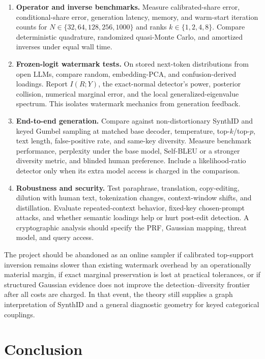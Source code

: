 \documentclass[11pt]{article}
\theoremstyle{definition}
\theoremstyle{remark}
\begin{document}
\begin{enumerate}
\item \textbf{Operator and inverse benchmarks.} Measure calibrated-share error, conditional-share error, generation latency, memory, and warm-start iteration counts for $N\in\{32,64,128,256,1000\}$ and ranks $k\in\{1,2,4,8\}$. Compare deterministic quadrature, randomized quasi-Monte Carlo, and amortized inverses under equal wall time.

\item \textbf{Frozen-logit watermark tests.} On stored next-token distributions from open LLMs, compare random, embedding-PCA, and confusion-derived loadings. Report $I(R;Y)$, the exact-normal detector's power, posterior collision, numerical marginal error, and the local generalized-eigenvalue spectrum. This isolates watermark mechanics from generation feedback.

\item \textbf{End-to-end generation.} Compare against non-distortionary SynthID and keyed Gumbel sampling at matched base decoder, temperature, top-$k$/top-$p$, text length, false-positive rate, and same-key diversity. Measure benchmark performance, perplexity under the base model, Self-BLEU or a stronger diversity metric, and blinded human preference. Include a likelihood-ratio detector only when its extra model access is charged in the comparison.

\item \textbf{Robustness and security.} Test paraphrase, translation, copy-editing, dilution with human text, tokenization changes, context-window shifts, and distillation. Evaluate repeated-context behavior, fixed-key chosen-prompt attacks, and whether semantic loadings help or hurt post-edit detection. A cryptographic analysis should specify the PRF, Gaussian mapping, threat model, and query access.
\end{enumerate}

The project should be abandoned as an online sampler if calibrated top-support inversion remains slower than existing watermark overhead by an operationally material margin, if exact marginal preservation is lost at practical tolerances, or if structured Gaussian evidence does not improve the detection--diversity frontier after all costs are charged. In that event, the theory still supplies a graph interpretation of SynthID and a general diagnostic geometry for keyed categorical couplings.

\section{Conclusion}
\label{sec:conclusion}
\end{document}
